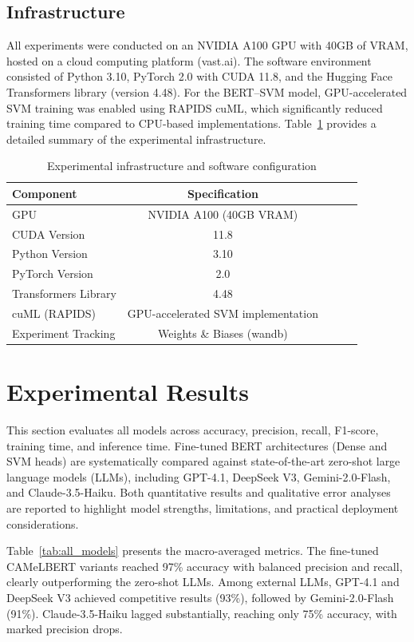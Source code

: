 \documentclass[sn-mathphys-num]{sn-jnl}
\begin{document}
\subsection{Infrastructure}
All experiments were conducted on an NVIDIA A100 GPU with 40GB of VRAM, hosted on a cloud computing platform (vast.ai). The software environment consisted of Python 3.10, PyTorch 2.0 with CUDA 11.8, and the Hugging Face Transformers library (version 4.48). For the BERT–SVM model, GPU-accelerated SVM training was enabled using RAPIDS cuML, which significantly reduced training time compared to CPU-based implementations. Table~\ref{tab:infrastructure} provides a detailed summary of the experimental infrastructure.

\begin{table}[!ht]
\centering
\caption{Experimental infrastructure and software configuration}
\label{tab:infrastructure}
\small
\begin{tabular}{lcccc}
\hline
\textbf{Component} & \textbf{Specification} \\
\hline
GPU & NVIDIA A100 (40GB VRAM) \\
CUDA Version & 11.8 \\
Python Version & 3.10 \\
PyTorch Version & 2.0 \\
Transformers Library & 4.48 \\
cuML (RAPIDS) & GPU-accelerated SVM implementation \\
Experiment Tracking & Weights \& Biases (wandb) \\
\hline
\end{tabular}
\end{table}

\section{Experimental Results}
\label{results}

This section evaluates all models across accuracy, precision, recall, F1-score, training time, and inference time. Fine-tuned BERT architectures (Dense and SVM heads) are systematically compared against state-of-the-art zero-shot large language models (LLMs), including GPT-4.1, DeepSeek V3, Gemini-2.0-Flash, and Claude-3.5-Haiku. Both quantitative results and qualitative error analyses are reported to highlight model strengths, limitations, and practical deployment considerations.

Table~\ref{tab:all_models} presents the macro-averaged metrics. The fine-tuned CAMeLBERT variants reached 97\% accuracy with balanced precision and recall, clearly outperforming the zero-shot LLMs. Among external LLMs, GPT-4.1 and DeepSeek V3 achieved competitive results (93\%), followed by Gemini-2.0-Flash (91\%). Claude-3.5-Haiku lagged substantially, reaching only 75\% accuracy, with marked precision drops.
\end{document}
